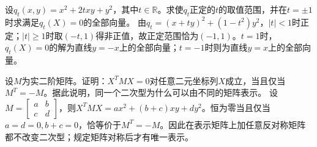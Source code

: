 设\(q_t(x,y)=x^{2}+2txy+y^{2}\)，其中\(t\in\mathbb{R}\)。求使\(q_t\)正定的\(t\)的取值范围，并在\(t=\pm1\)时求满足\(q_t(X)=0\)的全部向量。
\solutionanswer
由\(q_t=(x+ty)^2+(1-t^2)y^2\)，\(|t|<1\)时正定；\(|t|\ge1\)时取\((-t,1)\)得非正值，故正定范围恰为\((-1,1)\)。\(t=1\)时，\(q_t(X)=0\)的解为直线\(y=-x\)上的全部向量；\(t=-1\)时则为直线\(y=x\)上的全部向量。


设\(M\)为实二阶矩阵。证明：\(X^{T}MX=0\)对任意二元坐标列\(X\)成立，当且仅当\(M^{T}=-M\)。据此说明，同一个二次型为什么可以由不同的矩阵表示。
\solutionanswer
设\(M=\begin{bmatrix}a&b\\c&d\end{bmatrix}\)，则\(X^TMX=ax^2+(b+c)xy+dy^2\)。恒为零当且仅当\(a=d=0,b+c=0\)，恰等价于\(M^T=-M\)。因此在表示矩阵上加任意反对称矩阵都不改变二次型；规定矩阵对称后才有唯一表示。
\par
